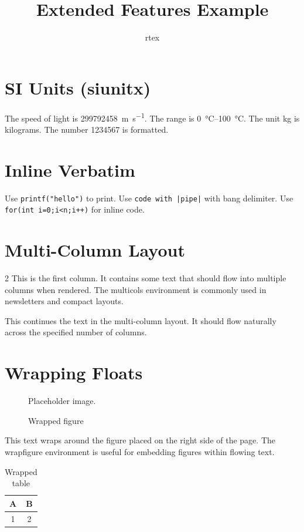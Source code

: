 \documentclass{article}
\title{Extended Features Example}
\author{rtex}
\begin{document}
\maketitle

\section{SI Units (siunitx)}

The speed of light is \SI{299792458}{\meter\per\second}.
The range is \SIrange{0}{100}{\celsius}.
The unit \si{\kilo\gram} is kilograms.
The number \num{1234567} is formatted.

\section{Inline Verbatim}

Use \verb|printf("hello")| to print.
Use \verb!code with |pipe|! with bang delimiter.
Use \lstinline|for(int i=0;i<n;i++)| for inline code.

\section{Multi-Column Layout}

\begin{multicols}{2}
This is the first column. It contains some text that should flow
into multiple columns when rendered. The multicols environment
is commonly used in newsletters and compact layouts.

This continues the text in the multi-column layout. It should
flow naturally across the specified number of columns.
\end{multicols}

\section{Wrapping Floats}

\begin{figure}
\centering
Placeholder image.
\caption{Wrapped figure}
\end{figure}

This text wraps around the figure placed on the right side
of the page. The wrapfigure environment is useful for
embedding figures within flowing text.

\begin{table}
\begin{tabular}{|c|c|}
\hline
A & B \\
\hline
1 & 2 \\
\hline
\end{tabular}
\caption{Wrapped table}
\end{table}
\end{document}
